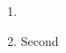 \documentclass{article}
\begin{document}
\begin{enumerate}
\item 
\item Second
\end{enumerate}
\end{document}
